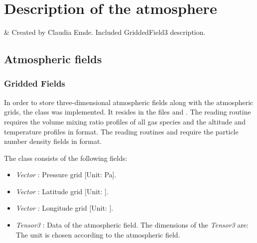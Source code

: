 \chapter{Description of the atmosphere}
 \label{sec:atmosphere}

 & Created by Claudia Emde. Included GriddedField3 description.\\ 
\stophistory


\section{Atmospheric fields} 
\label{sec:atmosphere:atmospheric_fields}

\subsection{Gridded Fields} 

In order to store three-dimensional atmospheric fields along with the
atmospheric grids, the class  was
implemented. It resides in the files  and
.  The reading routine
 requires the volume mixing ratio profiles of all
gas species and the altitude and temperature profiles in
 format. The reading routines
 and  require
the particle number density fields in  format.

The class  consists of the following fields:
\begin{itemize}
\item {\sl Vector} : Pressure grid [Unit: Pa].
\item {\sl Vector} : Latitude grid [Unit:
  \degree].
\item {\sl Vector} : Longitude grid [Unit:
  \degree].
\item {\sl Tensor3} : Data of the atmospheric
  field. The dimensions of the {\sl Tensor3} are:
  \\
  The unit is chosen according to the atmospheric field. 
\end{itemize} 





